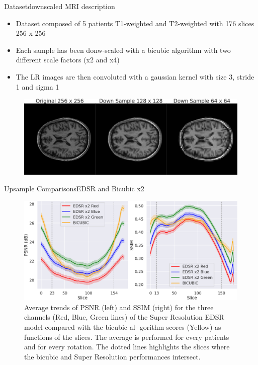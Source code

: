 \documentclass[10pt, unicode]{beamer}
\begin{document}
\begin{frame}{Dataset}{downscaled MRI description}
 \begin{itemize}
  \item Dataset composed of 5 patients T1-weighted and T2-weighted with 176 slices 256 x 256
  \item Each sample has been donw-scaled with a bicubic algorithm with two different scale factors (x2 and x4)
  \item The LR images are then convoluted with a gaussian kernel with size 3, stride 1 and sigma 1
 \end{itemize}
 
 \begin{figure}
  \includegraphics[scale=0.19]{./images/donwsamples}
 \end{figure}

\end{frame}



\begin{frame}{Upsample Comparisons}{EDSR and Bicubic x2}

\begin{figure}
\centering
\includegraphics[scale=0.21]{./images/edsr_score_slide.png}
\caption{Average trends of PSNR (left) and SSIM (right) for the three channels (Red,
Blue, Green lines) of the Super Resolution EDSR model compared with the bicubic al-
gorithm scores (Yellow) as functions of the slices. The average is performed for every
patients and for every rotation. The dotted lines highlights the slices where the bicubic
and Super Resolution performances intersect.}
\end{figure}
\end{frame}
\end{document}

